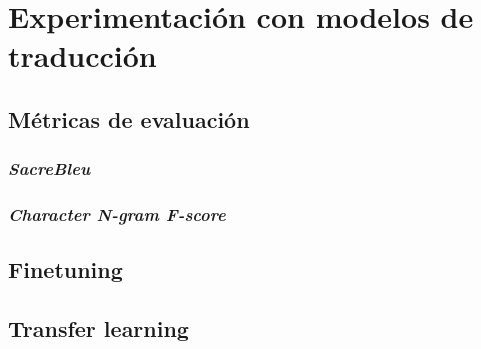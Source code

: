 \chapter{Experimentación con modelos de traducción}
\section{Métricas de evaluación}
\subsection{\textit{SacreBleu}}
\subsection{\textit{Character N-gram F-score}}
\section{Finetuning}
\section{Transfer learning}